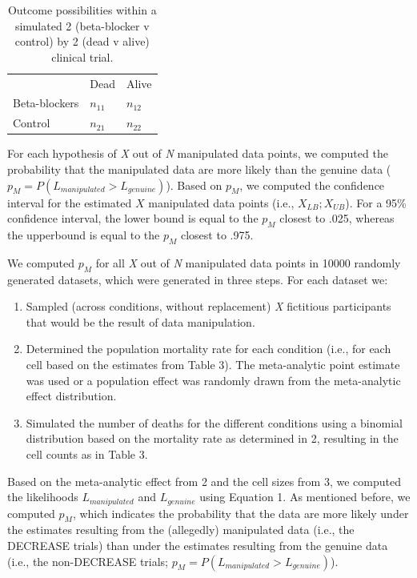 \documentclass[]{article}
\begin{document}
\begin{longtable}[]{@{}lll@{}}
\caption{Outcome possibilities within a simulated 2 (beta-blocker v
control) by 2 (dead v alive) clinical trial.}\tabularnewline
\toprule
\begin{minipage}[t]{0.32\columnwidth}\raggedright\strut
\strut
\end{minipage} & \begin{minipage}[t]{0.32\columnwidth}\raggedright\strut
Dead\strut
\end{minipage} & \begin{minipage}[t]{0.32\columnwidth}\raggedright\strut
Alive\strut
\end{minipage}\tabularnewline
Beta-blockers & \(n_{11}\) & \(n_{12}\)\tabularnewline
Control & \(n_{21}\) & \(n_{22}\)\tabularnewline
\bottomrule
\end{longtable}

For each hypothesis of \emph{X} out of \emph{N} manipulated data points,
we computed the probability that the manipulated data are more likely
than the genuine data (\(p_M=P(L_{manipulated}>L_{genuine})\)). Based on
\(p_M\), we computed the confidence interval for the estimated \(X\)
manipulated data points (i.e., \(X_{LB};X_{UB}\)). For a 95\% confidence
interval, the lower bound is equal to the \(p_M\) closest to .025,
whereas the upperbound is equal to the \(p_M\) closest to .975.

We computed \(p_M\) for all \emph{X} out of \emph{N} manipulated data
points in 10000 randomly generated datasets, which were generated in
three steps. For each dataset we:

\begin{enumerate}
\def\labelenumi{\arabic{enumi}.}
\item
  Sampled (across conditions, without replacement) \emph{X} fictitious
  participants that would be the result of data manipulation.
\item
  Determined the population mortality rate for each condition (i.e., for
  each cell based on the estimates from Table 3). The meta-analytic
  point estimate was used or a population effect was randomly drawn from
  the meta-analytic effect distribution.
\item
  Simulated the number of deaths for the different conditions using a
  binomial distribution based on the mortality rate as determined in 2,
  resulting in the cell counts as in Table 3.
\end{enumerate}

Based on the meta-analytic effect from 2 and the cell sizes from 3, we
computed the likelihoods \(L_{manipulated}\) and \(L_{genuine}\) using
Equation 1. As mentioned before, we computed \(p_M\), which indicates
the probability that the data are more likely under the estimates
resulting from the (allegedly) manipulated data (i.e., the DECREASE
trials) than under the estimates resulting from the genuine data (i.e.,
the non-DECREASE trials; \(p_M=P(L_{manipulated}>L_{genuine})\)).
\end{document}
